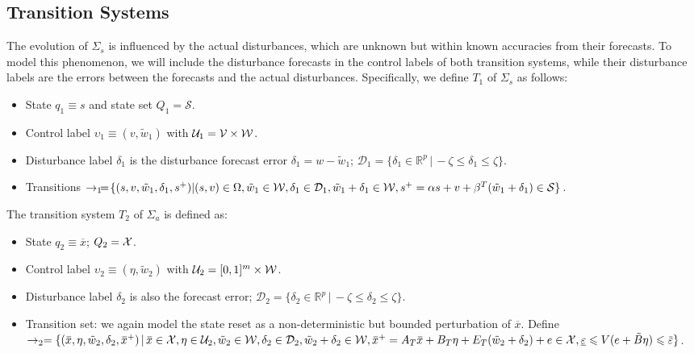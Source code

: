 
\subsection{Transition Systems}
\label{sec:abstraction-gs:feedback:Ts}

The evolution of $\Sigma_{s}$ %
is influenced by the actual disturbances, which are unknown but within known accuracies from their forecasts.
To model this phenomenon, we will include the disturbance forecasts in the control labels of both transition systems, %
while their disturbance labels are the errors between the forecasts and the actual disturbances.
Specifically, we define $T_{1}$ of $\Sigma_{s}$ as follows:
\begin{itemize}
\item State $q_{1} \equiv s$ and state set $Q_{1} = \mathcal{S}$.
\item Control label $\upsilon_{1} \equiv (v, \tilde{w}_{1})$ with $\mathcal{U}_{1} = \mathcal{V} \times \mathcal{W}$.
\item Disturbance label $\delta_{1}$ is the disturbance forecast error $\delta_{1} = w - \tilde{w}_{1}$; $\mathcal{D}_{1} = \{ \delta_{1} \in \mathbb{R}^{p} \,|\, -\zeta \leqslant \delta_{1} \leqslant \zeta\}$.
\item Transitions %
  $\rightarrow_{1} \!=\! \{ (s, v, \tilde{w}_{1}, \delta_{1}, s^{+}) | (s,v) \in \Omega,\allowbreak \tilde{w}_{1} \in \mathcal{W},\allowbreak \delta_{1} \in \mathcal{D}_{1},\allowbreak \tilde{w}_{1} + \delta_{1} \in \mathcal{W},\allowbreak s^{+} = \alpha s + v + \beta^{T} (\tilde{w}_{1} + \delta_{1}) \in \mathcal{S}\}$. %
\end{itemize}
%
The transition system $T_{2}$ of $\Sigma_{a}$ is defined as:
\begin{itemize}
\item State $q_{2} \equiv \overbar{x}$; $Q_{2} = \mathcal{X}$.
\item Control label $\upsilon_{2} \equiv (\eta, \tilde{w}_{2})$ with $\mathcal{U}_{2} = [0,1]^{m} \times \mathcal{W}$.
\item Disturbance label $\delta_{2}$ is also the forecast error; $\mathcal{D}_{2} = \{ \delta_{2} \in \mathbb{R}^{p} \,|\, -\zeta \leqslant \delta_{2} \leqslant \zeta\}$.
\item Transition set: we again model the state reset as a non-deterministic but bounded perturbation of $\overbar{x}$.   Define $\rightarrow_{2} = \{ (\overbar{x}, \eta, \tilde{w}_{2}, \delta_{2}, \overbar{x}^{+}) \,|\, \overbar{x} \in \XSet, \eta \in \mathcal{U}_{2}, \tilde{w}_{2} \in \WSet,\allowbreak \delta_{2} \in \mathcal{D}_{2},\allowbreak \tilde{w}_{2} + \delta_{2} \in \WSet,\allowbreak \overbar{x}^{+} = A_{T} \overbar{x}+ B_{T} \eta + E_{T} (\tilde{w}_{2} + \delta_{2}) + e \in \XSet,\allowbreak \underline{\varepsilon} \leqslant V (e + \tilde{B} \eta) \leqslant \overbar{\varepsilon}\}$.
\end{itemize}

